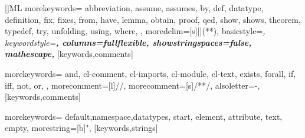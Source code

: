 \RequirePackage{listings}
% 
% 
% 
% 

[]{ML}%
{morekeywords={%
abbreviation,%
assume,%
assumes,%
by,%
def,%
datatype,%
definition,%
fix,%
fixes,%
from,%
have,%
lemma,%
obtain,%
proof,%
qed,%
show,%
shows,%
theorem,%
typedef,%
try,%
unfolding,%
using,%
where,%
},
moredelim=[s][\color{IsabelleStringBackground}]{(*}{*)},
basicstyle=\itshape,%
keywordstyle=\upshape\bfseries,%
columns=fullflexible,%
showstringspaces=false,%
mathescape,%
}[keywords,comments]


%
{morekeywords={%
and,%
cl-comment,%
cl-imports,%
cl-module,%
cl-text,%
exists,%
forall,%
if,%
iff,%
not,%
or,%
},
morecomment=[l]{//},%
morecomment=[s]{/*}{*/},%
alsoletter=-,%
}[keywords,comments]

%
{morekeywords={%
default,namespace,datatypes,%
start,%
element,%
attribute,%
text,%
empty},
morestring=[b]",%
}[keywords,strings]

